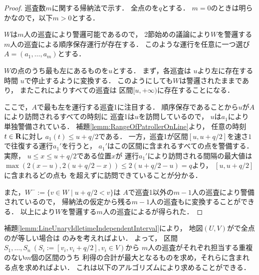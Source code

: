 \begin{proof}
  \newcommand{\leftmostpoint}{u}  %
  \newcommand{\leftmostpatroller}{巡査1}

  巡査数$m$に関する帰納法で示す．
  全点の{\maxIdletime}を$q$とする．
  $m = 0$のときは明らかなので，以下$m > 0$とする．

  $W$は$m$人の巡査により警邏可能であるので，
  2節始めの議論により$W$を警邏する$m$人の巡査による順序保存運行が存在する．
  このような運行を任意に一つ選び
  $A = (a_1, \ldots, a_m)$とする．

  $W$の点のうち最も左にあるものを$\leftmostpoint$とする．
  まず，各巡査は
  $\leftmostpoint$より左に存在する時間
  $\leftmostpoint$で停止するように変換する．
  このようにしても$W$は警邏されたままであり，
  またこれによりすべての巡査は
  区間$[\leftmostpoint, +\infty)$に存在することになる．

  ここで，$A$で最も左を運行する{\leftmostpatroller}に注目する．
  順序保存であることから$\leftmostpoint$が$A$により訪問されるすべての時刻に
  {\leftmostpatroller}は$\leftmostpoint$を訪問しているので，
  $\leftmostpoint$は$a_1$により単独警備されている．
  補題\ref{lemm:RangeOfPatrollerOnLine}より，
  任意の時刻$t \in \mathbf R$に対し
  $a_1(t) \leq \leftmostpoint + q/2$である．
  一方，{\leftmostpatroller}が区間$[\leftmostpoint, \leftmostpoint + q/2]$を速さ$1$で往復する運行$a_1'$を行うと，
  $a_1'$はこの区間に含まれるすべての点を警備する．
  実際，
  $\leftmostpoint \leq x \leq \leftmostpoint + q/2$である位置$x$が
  運行$a_1'$により訪問される間隔の最大値は
  $ \max( 2(x - \leftmostpoint), 2(\leftmostpoint + q/2 - x) )
    \leq 2(\leftmostpoint + q/2 - \leftmostpoint) = q$より，
    $[\leftmostpoint, \leftmostpoint + q/2]$に含まれるどの点も
  {\maxIdletime}を超えずに訪問できていることが分かる．

  また，$W^- := \{ v \in W \mid \leftmostpoint + q/2 < v \}$は
  $A$で{\leftmostpatroller}以外の$m - 1$人の巡査により警備されているので，
  帰納法の仮定から残る$m - 1$人の巡査も{\indSectOperation}に変換することができる．
  以上により$W$を警邏する$m$人の巡査による{\indSectOperation}が得られた．
\end{proof}


補題\ref{lemm:LineUnaryIdletimeIndependentInterval}により，
地図$(U, V)$が{\graphLine}で全点の{\maxIdletime}が等しい場合は
{\indSectOperation}のみを考えればよい．
よって，
区間$S_1, \ldots, S_n\ (S_i := [v_i, v_i + q/2], v_i \in V)$から
$m$人の巡査がそれぞれ担当する重複のない$m$個の区間のうち
利得の合計が最大となるものを求め，それらに含まれる点を求めればよい．
これは以下のアルゴリズムにより求めることができる．

